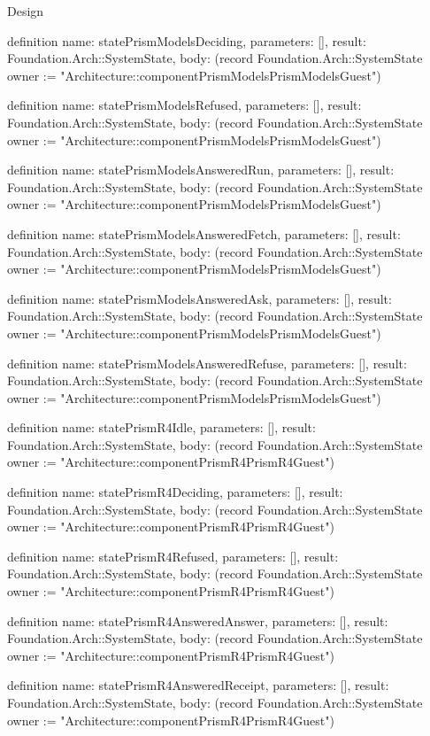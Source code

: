 \begin{lexlean}{Design}
\begin{semanticmodule}
definition{
  name: statePrismModelsDeciding,
  parameters: [],
  result: Foundation.Arch::SystemState,
  body: (record Foundation.Arch::SystemState {owner := "Architecture::componentPrismModelsPrismModelsGuest"})
}

definition{
  name: statePrismModelsRefused,
  parameters: [],
  result: Foundation.Arch::SystemState,
  body: (record Foundation.Arch::SystemState {owner := "Architecture::componentPrismModelsPrismModelsGuest"})
}

definition{
  name: statePrismModelsAnsweredRun,
  parameters: [],
  result: Foundation.Arch::SystemState,
  body: (record Foundation.Arch::SystemState {owner := "Architecture::componentPrismModelsPrismModelsGuest"})
}

definition{
  name: statePrismModelsAnsweredFetch,
  parameters: [],
  result: Foundation.Arch::SystemState,
  body: (record Foundation.Arch::SystemState {owner := "Architecture::componentPrismModelsPrismModelsGuest"})
}

definition{
  name: statePrismModelsAnsweredAsk,
  parameters: [],
  result: Foundation.Arch::SystemState,
  body: (record Foundation.Arch::SystemState {owner := "Architecture::componentPrismModelsPrismModelsGuest"})
}

definition{
  name: statePrismModelsAnsweredRefuse,
  parameters: [],
  result: Foundation.Arch::SystemState,
  body: (record Foundation.Arch::SystemState {owner := "Architecture::componentPrismModelsPrismModelsGuest"})
}

definition{
  name: statePrismR4Idle,
  parameters: [],
  result: Foundation.Arch::SystemState,
  body: (record Foundation.Arch::SystemState {owner := "Architecture::componentPrismR4PrismR4Guest"})
}

definition{
  name: statePrismR4Deciding,
  parameters: [],
  result: Foundation.Arch::SystemState,
  body: (record Foundation.Arch::SystemState {owner := "Architecture::componentPrismR4PrismR4Guest"})
}

definition{
  name: statePrismR4Refused,
  parameters: [],
  result: Foundation.Arch::SystemState,
  body: (record Foundation.Arch::SystemState {owner := "Architecture::componentPrismR4PrismR4Guest"})
}

definition{
  name: statePrismR4AnsweredAnswer,
  parameters: [],
  result: Foundation.Arch::SystemState,
  body: (record Foundation.Arch::SystemState {owner := "Architecture::componentPrismR4PrismR4Guest"})
}

definition{
  name: statePrismR4AnsweredReceipt,
  parameters: [],
  result: Foundation.Arch::SystemState,
  body: (record Foundation.Arch::SystemState {owner := "Architecture::componentPrismR4PrismR4Guest"})
}


\end{semanticmodule}
\end{lexlean}
